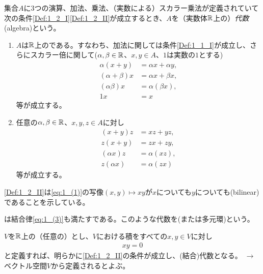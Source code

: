 \documentclass[fleqn,twocolumn,titlepage,dvipdfmx]{jsarticle}
\begin{document}
\begin{definition}[代数]\label{Def:1_2}
  集合$A$に3つの演算、加法、乗法、（実数による）スカラー乗法が定義されていて次の条件\ref{Def:1_2_I}\ref{Def:1_2_II}が成立するとき、$A$を（実数体$\mathbb{R}$上の）\emph{代数}(algebra)という。

  \begin{enumerate}[label=(\Roman*$^\prime$)]
    \item \label{Def:1_2_I}
      $A$は$\mathbb{R}$上のである。すなわち、加法に関しては条件\ref{Def:1_1_I}が成立し、さらにスカラー倍に関して($\alpha,\beta\in\mathbb{R}$、$x,y\in A$、$1$は実数の$1$とする)
      \begin{align*}
        \alpha(x+y) &= \alpha x+\alpha y, \\
        (\alpha+\beta)x &= \alpha x + \beta x, \\
        (\alpha\beta)x &= \alpha(\beta x), \\
        1x &= x
      \end{align*}
      等が成立する。
    \item \label{Def:1_2_II}
      任意の$\alpha,\beta\in\mathbb{R}$、$x,y,z\in A$に対し
      \begin{align*}
        (x+y)z &= xz+yz,\\
        z(x+y) &= zx+zy,\\
        (\alpha x)z &= \alpha(xz),\\
        z(\alpha x) &= \alpha(zx)
      \end{align*}
      等が成立する。
  \end{enumerate}
\end{definition}

\begin{remark}
  \ref{Def:1_2_II}は\eqref{eq:1_(1)}の写像$(x,y)\mapsto xy$が$x$についても$y$についても(bilinear)であることを示している。
\end{remark}

\begin{named}
  は結合律\eqref{eq:1_(3)}も満たす{}である。このような代数を(または多元環)という。
\end{named}

\begin{named}
  $V$を$\mathbb{R}$上の（任意の）とし、$V$における積をすべての$x,y\in V$に対し
  \begin{align*}
    xy=0 \tag{4}\label{eq:1_(4)}
  \end{align*}
  と定義すれば、明らかに\ref{Def:1_2_II}の条件が成立し、(結合)代数となる。
  $\to$ ベクトル空間$V$から定義されるとよぶ。
\end{named}
\end{document}
